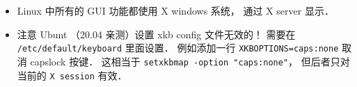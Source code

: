 
\begin{itemize}
\item Linux 中所有的 GUI 功能都使用 X windows 系统， 通过 X server 显示．
\item 注意 Ubunt （20.04 亲测）设置 xkb config 文件无效的！ 需要在 \verb|/etc/default/keyboard| 里面设置． 例如添加一行 \verb|XKBOPTIONS=caps:none| 取消 capslock 按键． 这相当于 \verb|setxkbmap -option "caps:none"|， 但后者只对当前的 \verb|X session| 有效．
\end{itemize}
